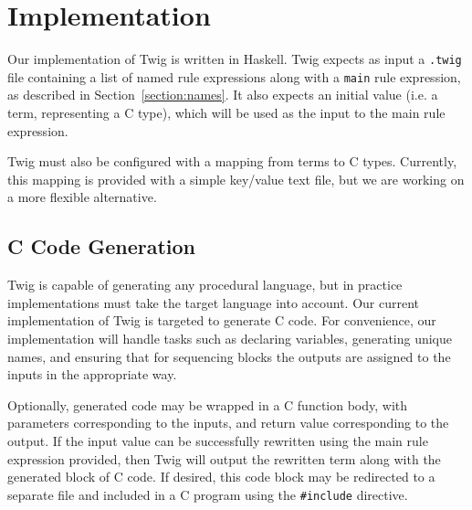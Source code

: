 
\section{Implementation}

Our implementation of Twig is written in Haskell. Twig expects as input a
\texttt{.twig} file containing a list of named rule expressions along with a
\texttt{main} rule expression, as described in Section~\ref{section:names}. It
also expects an initial value (i.e. a term, representing a C type), which will
be used as the input to the main rule expression.

Twig must also be configured with a mapping from terms to C types. Currently,
this mapping is provided with a simple key/value text file, but we are working
on a more flexible alternative.

\subsection{C Code Generation}
\label{twig:concrete-code-gen}

Twig is capable of generating any procedural language, but in practice
implementations must take the target language into account. Our current
implementation of Twig is targeted to generate C code. For convenience, our
implementation will handle tasks such as declaring variables, generating unique
names, and ensuring that for sequencing blocks the outputs are assigned to the
inputs in the appropriate way.

Optionally, generated code may be wrapped in a C function body, with parameters
corresponding to the inputs, and return value corresponding to the output.
If the input value can be successfully rewritten using the main rule
expression provided, then Twig will output the rewritten term along with the
generated block of C code. If desired, this code block may be redirected to a
separate file and included in a C program using the \texttt{\#include}
directive.
